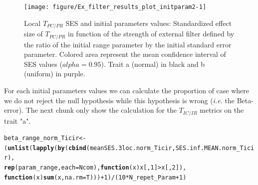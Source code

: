 \documentclass[12pt]{article}\usepackage[]{graphicx}\usepackage[]{color}
\makeatletter
\newcommand{\hlnum}[1]{\textcolor[rgb]{0.686,0.059,0.569}{#1}}%
\newcommand{\hlopt}[1]{\textcolor[rgb]{0,0,0}{#1}}%
\newcommand{\hlstd}[1]{\textcolor[rgb]{0.345,0.345,0.345}{#1}}%
\newcommand{\hlkwa}[1]{\textcolor[rgb]{0.161,0.373,0.58}{\textbf{#1}}}%
\newcommand{\hlkwb}[1]{\textcolor[rgb]{0.69,0.353,0.396}{#1}}%
\newcommand{\hlkwc}[1]{\textcolor[rgb]{0.333,0.667,0.333}{#1}}%
\newcommand{\hlkwd}[1]{\textcolor[rgb]{0.737,0.353,0.396}{\textbf{#1}}}%
\newenvironment{kframe}{%
 \def\at@end@of@kframe{}%
 \ifinner\ifhmode%
  \def\at@end@of@kframe{\end{minipage}}%
  \begin{minipage}{\columnwidth}%
 \fi\fi%
 \def\FrameCommand##1{\hskip\@totalleftmargin \hskip-\fboxsep
 \colorbox{shadecolor}{##1}\hskip-\fboxsep
     \hskip-\linewidth \hskip-\@totalleftmargin \hskip\columnwidth}%
 \MakeFramed {\advance\hsize-\width
   \@totalleftmargin\z@ \linewidth\hsize
   \@setminipage}}%
 {\par\unskip\endMakeFramed%
 \at@end@of@kframe}
\newenvironment{knitrout}{}{} %
\makeatother
\begin{document}
\begin{knitrout}
\begin{figure}
{\centering \texttt{[image: figure/Ex\_filter\_results\_plot\_initparam2-1]} 

}

\caption[Local $T_{PC/PR}$ SES and initial parameters values]{Local $T_{PC/PR}$ SES and initial parameters values: Standardized effect size of $T_{PC/PR}$ in function of the strength of external filter defined by the ratio of the initial range parameter by the initial standard error parameter. Colored area represent the mean confidence interval of SES values ($alpha = 0.95$). Trait a (normal) in black and b (uniform) in purple.\label{fig:Ex_filter_results_plot_initparam2}}
\end{figure}


\end{knitrout}
 
For each initial parameters values we can calculate the proportion of case where we do not reject the null hypothesis while this hypothesis is wrong (\textit{i.e.} the Beta-error). The next chunk only show the calculation for the $T_{IC/IR}$ metrics on the trait "a".

\begin{knitrout}\small
{}\color{fgcolor}\begin{kframe}
\begin{alltt}
\hlstd{beta_range_norm_Ticir} \hlkwb{<-}
 \hlstd{(}\hlkwd{unlist}\hlstd{(}\hlkwd{lapply}\hlstd{(}\hlkwd{by}\hlstd{(}\hlkwd{cbind}\hlstd{(meanSES.3loc.norm_Ticir, SES.inf.MEAN.norm_Ticir),}
     \hlkwd{rep}\hlstd{(param_range,} \hlkwc{each} \hlstd{= Ncom),} \hlkwa{function}\hlstd{(}\hlkwc{x}\hlstd{) x[,}\hlnum{1}\hlstd{]} \hlopt{>} \hlstd{x[,}\hlnum{2}\hlstd{]),}
     \hlkwa{function}\hlstd{(}\hlkwc{x}\hlstd{)} \hlkwd{sum}\hlstd{(x,} \hlkwc{na.rm} \hlstd{= T)))}\hlopt{+}\hlnum{1}\hlstd{)}\hlopt{/}\hlstd{(}\hlnum{10} \hlopt{*} \hlstd{N_repet_Param} \hlopt{+} \hlnum{1}\hlstd{)}
\end{alltt}
\end{kframe}
\end{knitrout}
\end{document}
